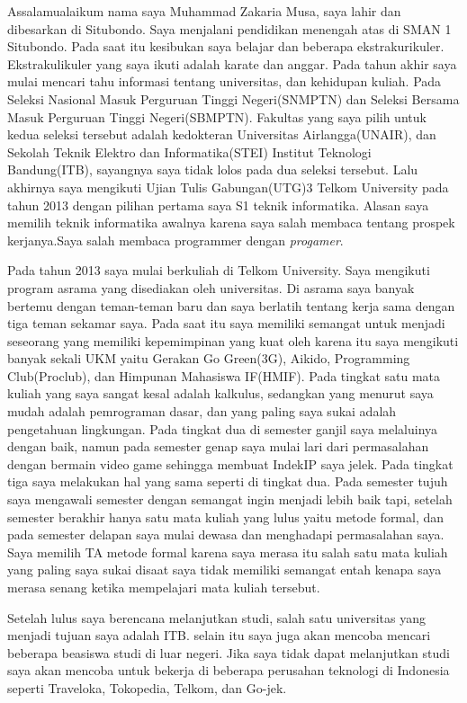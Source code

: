 \documentclass[a4paper,oneside,final,notitlepage,onecolumn,12pt]{article}%
\begin{document}
Assalamualaikum nama saya Muhammad Zakaria Musa, saya lahir dan dibesarkan di Situbondo. Saya menjalani pendidikan menengah atas di SMAN 1 Situbondo. Pada saat itu kesibukan saya belajar dan beberapa ekstrakurikuler. Ekstrakulikuler yang saya ikuti adalah karate dan anggar. Pada tahun akhir saya mulai mencari tahu informasi tentang universitas, dan kehidupan kuliah. Pada Seleksi Nasional Masuk Perguruan Tinggi Negeri(SNMPTN) dan Seleksi Bersama Masuk Perguruan Tinggi Negeri(SBMPTN). Fakultas yang saya pilih untuk kedua seleksi tersebut adalah kedokteran Universitas Airlangga(UNAIR), dan Sekolah Teknik Elektro dan Informatika(STEI) Institut Teknologi Bandung(ITB), sayangnya saya tidak lolos pada dua seleksi tersebut. Lalu akhirnya saya mengikuti Ujian Tulis Gabungan(UTG)3 Telkom University pada tahun 2013 dengan pilihan pertama saya S1 teknik informatika. Alasan saya memilih teknik informatika awalnya karena saya salah membaca tentang prospek kerjanya.Saya salah membaca programmer dengan \textit{progamer}.

Pada tahun 2013 saya mulai berkuliah di Telkom University. Saya mengikuti program asrama yang disediakan oleh universitas. Di asrama saya banyak bertemu dengan teman-teman baru dan saya berlatih tentang kerja sama dengan tiga teman sekamar saya. Pada saat itu saya memiliki semangat untuk menjadi seseorang yang memiliki kepemimpinan yang kuat oleh karena itu saya mengikuti banyak sekali UKM yaitu Gerakan Go Green(3G), Aikido, Programming Club(Proclub), dan Himpunan Mahasiswa IF(HMIF). Pada tingkat satu mata kuliah yang saya sangat kesal adalah kalkulus, sedangkan yang menurut saya mudah adalah pemrograman dasar, dan yang paling saya sukai adalah pengetahuan lingkungan. Pada tingkat dua di semester ganjil saya melaluinya dengan baik, namun pada semester genap saya mulai lari dari permasalahan dengan bermain video game sehingga membuat IndekIP saya jelek. Pada tingkat tiga saya melakukan hal yang sama seperti di tingkat dua. Pada semester tujuh saya mengawali semester dengan semangat ingin menjadi lebih baik tapi, setelah semester berakhir hanya satu mata kuliah yang lulus yaitu metode formal, dan pada semester delapan saya mulai dewasa dan menghadapi permasalahan saya. Saya memilih TA metode formal karena saya merasa itu salah satu mata kuliah yang paling saya sukai disaat saya tidak memiliki semangat entah kenapa saya merasa senang ketika mempelajari mata kuliah tersebut. 

Setelah lulus saya berencana melanjutkan studi, salah satu universitas yang menjadi tujuan saya adalah ITB. selain itu saya juga akan mencoba mencari beberapa beasiswa studi di luar negeri. Jika saya tidak dapat melanjutkan studi saya akan mencoba untuk bekerja di beberapa perusahan teknologi di Indonesia seperti Traveloka, Tokopedia, Telkom, dan Go-jek.
\end{document}
